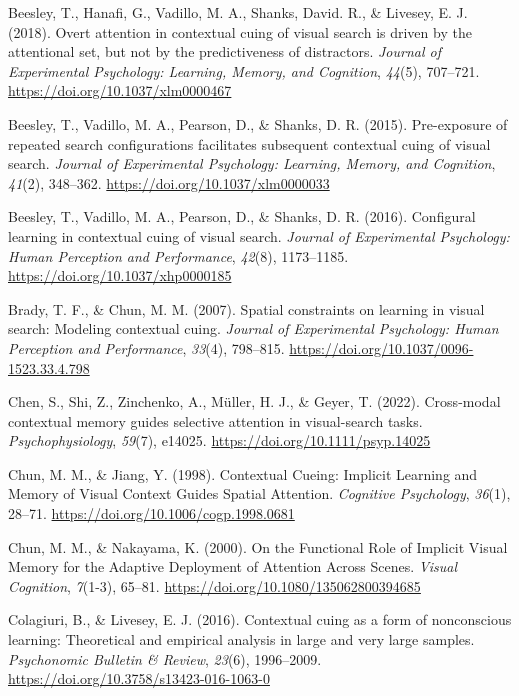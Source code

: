 \documentclass[
  man,
  floatsintext,
  longtable,
  nolmodern,
  notxfonts,
  notimes,
  colorlinks=true,linkcolor=blue,citecolor=blue,urlcolor=blue]{apa7}
\newlength{\cslhangindent}
\newenvironment{CSLReferences}[2] %
 {\begin{list}{}{%
  \setlength{\itemindent}{0pt}
  \setlength{\leftmargin}{0pt}
  \setlength{\parsep}{0pt}
  \ifodd #1
   \setlength{\leftmargin}{\cslhangindent}
   \setlength{\itemindent}{-1\cslhangindent}
  \fi
  \setlength{\itemsep}{#2\baselineskip}}}
 {\end{list}}
\begin{document}
\label{refs}
\begin{CSLReferences}{1}{0}
Beesley, T., Hanafi, G., Vadillo, M. A., Shanks, David. R., \& Livesey,
E. J. (2018). Overt attention in contextual cuing of visual search is
driven by the attentional set, but not by the predictiveness of
distractors. \emph{Journal of Experimental Psychology: Learning, Memory,
and Cognition}, \emph{44}(5), 707--721.
\url{https://doi.org/10.1037/xlm0000467}

Beesley, T., Vadillo, M. A., Pearson, D., \& Shanks, D. R. (2015).
Pre-exposure of repeated search configurations facilitates subsequent
contextual cuing of visual search. \emph{Journal of Experimental
Psychology: Learning, Memory, and Cognition}, \emph{41}(2), 348--362.
\url{https://doi.org/10.1037/xlm0000033}

Beesley, T., Vadillo, M. A., Pearson, D., \& Shanks, D. R. (2016).
Configural learning in contextual cuing of visual search. \emph{Journal
of Experimental Psychology: Human Perception and Performance},
\emph{42}(8), 1173--1185. \url{https://doi.org/10.1037/xhp0000185}

Brady, T. F., \& Chun, M. M. (2007). Spatial constraints on learning in
visual search: {Modeling} contextual cuing. \emph{Journal of
Experimental Psychology: Human Perception and Performance},
\emph{33}(4), 798--815. \url{https://doi.org/10.1037/0096-1523.33.4.798}

Chen, S., Shi, Z., Zinchenko, A., Müller, H. J., \& Geyer, T. (2022).
Cross-modal contextual memory guides selective attention in
visual-search tasks. \emph{Psychophysiology}, \emph{59}(7), e14025.
\url{https://doi.org/10.1111/psyp.14025}

Chun, M. M., \& Jiang, Y. (1998). Contextual {Cueing}: {Implicit
Learning} and {Memory} of {Visual Context Guides Spatial Attention}.
\emph{Cognitive Psychology}, \emph{36}(1), 28--71.
\url{https://doi.org/10.1006/cogp.1998.0681}

Chun, M. M., \& Nakayama, K. (2000). On the {Functional Role} of
{Implicit Visual Memory} for the {Adaptive Deployment} of {Attention
Across Scenes}. \emph{Visual Cognition}, \emph{7}(1-3), 65--81.
\url{https://doi.org/10.1080/135062800394685}

Colagiuri, B., \& Livesey, E. J. (2016). Contextual cuing as a form of
nonconscious learning: {Theoretical} and empirical analysis in large and
very large samples. \emph{Psychonomic Bulletin \& Review}, \emph{23}(6),
1996--2009. \url{https://doi.org/10.3758/s13423-016-1063-0}


\end{CSLReferences}
\end{document}

